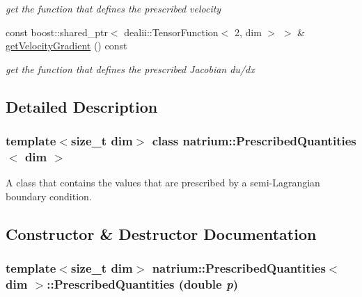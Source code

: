\begin{DoxyCompactItemize}
\begin{DoxyCompactList}\small\item\em get the function that defines the prescribed velocity \item\end{DoxyCompactList}\item 
\hypertarget{classnatrium_1_1PrescribedQuantities_a24c5a8a0ec450a88c3fdbb4ba3f71f6c}{
const boost::shared\_\-ptr$<$ dealii::TensorFunction$<$ 2, dim $>$ $>$ \& \hyperlink{classnatrium_1_1PrescribedQuantities_a24c5a8a0ec450a88c3fdbb4ba3f71f6c}{getVelocityGradient} () const }
\label{classnatrium_1_1PrescribedQuantities_a24c5a8a0ec450a88c3fdbb4ba3f71f6c}

\begin{DoxyCompactList}\small\item\em get the function that defines the prescribed Jacobian du/dx \item\end{DoxyCompactList}\end{DoxyCompactItemize}


\subsection{Detailed Description}
\subsubsection*{template$<$size\_\-t dim$>$ class natrium::PrescribedQuantities$<$ dim $>$}

A class that contains the values that are prescribed by a semi-\/Lagrangian boundary condition. 

\subsection{Constructor \& Destructor Documentation}
\hypertarget{classnatrium_1_1PrescribedQuantities_abac8488a975cb98a6412adb903ad66ab}{
\subsubsection[{PrescribedQuantities}]{\setlength{\rightskip}{0pt plus 5cm}template$<$size\_\-t dim$>$ {\bf natrium::PrescribedQuantities}$<$ dim $>$::{\bf PrescribedQuantities} (double {\em p})}}
\label{classnatrium_1_1PrescribedQuantities_abac8488a975cb98a6412adb903ad66ab}


